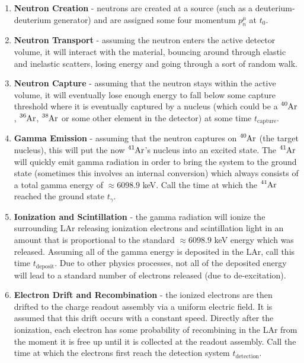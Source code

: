 \documentclass[8pt]{refart}
\begin{document}
\begin{enumerate}
    \item \textbf{Neutron Creation} - neutrons are created at a source (such as a deuterium-deuterium generator) and are assigned some four momentum $p^{\mu}_n$ at $t_0$.
    \item \textbf{Neutron Transport} - assuming the neutron enters the active detector volume, it will interact with the material, bouncing around through elastic and inelastic scatters, losing energy and going through a sort of random walk.
    \item \textbf{Neutron Capture} - assuming that the neutron stays within the active volume, it will eventually lose enough energy to fall below some capture threshold where it is eventually captured by a nucleus (which could be a $\ce{^{40}Ar}$, $\ce{^{36}Ar}$, $\ce{^{38}Ar}$ or some other element in the detector) at some time $t_{\mathrm{capture}}$.
    \item \textbf{Gamma Emission} - assuming that the neutron captures on $\ce{^{40}Ar}$ (the target nucleus), this will put the now $\ce{^{41}Ar}$'s nucleus into an excited state.  The $\ce{^{41}Ar}$ will quickly emit gamma radiation in order to bring the system to the ground state (sometimes this involves an internal conversion) which always consists of a total gamma energy of $\approx 6098.9$ keV.  Call the time at which the $\ce{^{41}Ar}$ reached the ground state $t_{\gamma}$.
    \item \textbf{Ionization and Scintillation} - the gamma radiation will ionize the surrounding LAr releasing ionization electrons and scintillation light in an amount that is proportional to the standard $\approx 6098.9$ keV energy which was released.  Assuming all of the gamma energy is deposited in the LAr, call this time $t_{\mathrm{deposit}}$.  Due to other physics processes, not all of the deposited energy will lead to a standard number of electrons released (due to de-excitation).
    \item \textbf{Electron Drift and Recombination} - the ionized electrons are then drifted to the charge readout assembly via a uniform electric field.  It is assumed that this drift occurs with a constant speed.  Directly after the ionization, each electron has some probability of recombining in the LAr from the moment it is free up until it is collected at the readout assembly.  Call the time at which the electrons first reach the detection system $t_{\mathrm{detection}}$.
\end{enumerate}
\end{document}
